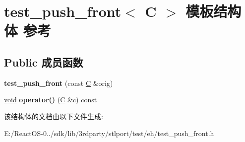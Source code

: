 \hypertarget{structtest__push__front}{}\section{test\+\_\+push\+\_\+front$<$ C $>$ 模板结构体 参考}
\label{structtest__push__front}
\subsection*{Public 成员函数}
\begin{DoxyCompactItemize}
\item 
\mbox{\label{structtest__push__front_a2c94f708d6926759f23ddfeef7001319}} 
{\bfseries test\+\_\+push\+\_\+front} (const \hyperlink{struct_c}{C} \&orig)
\item 
\mbox{\label{structtest__push__front_a3a11ded16f2dda6ae374ca888934d09b}} 
\hyperlink{interfacevoid}{void} {\bfseries operator()} (\hyperlink{struct_c}{C} \&c) const
\end{DoxyCompactItemize}


该结构体的文档由以下文件生成\+:\begin{DoxyCompactItemize}
\item 
E\+:/\+React\+O\+S-\/0../sdk/lib/3rdparty/stlport/test/eh/test\+\_\+push\+\_\+front.\+h\end{DoxyCompactItemize}
